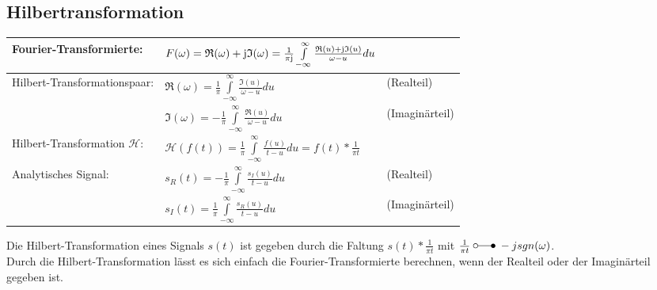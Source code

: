 \subsection{Hilbertransformation}
	\begin{tabular}{| l | l l |}
		\hline
			Fourier-Transformierte: & $F(\omega) = \mathfrak{R}(\omega) + \im \mathfrak{I}(\omega)
			= \frac{1}{\pi \im} \int\limits_{-\infty}^{\infty}\frac{\mathfrak{R}(u) + \im \mathfrak{I}(u)}{\omega - u} du$ & \\
		\hline
			Hilbert-Transformationspaar: & $\mathfrak{R}(\omega) = \frac{1}{\pi} \int\limits_{-\infty}^{\infty} \frac{\mathfrak{I}(u)}{\omega - u} du$ & (Realteil)\\
			& $\mathfrak{I}(\omega) = -\frac{1}{\pi} \int\limits_{-\infty}^{\infty} \frac{\mathfrak{R}(u)}{\omega - u} du$ & (Imaginärteil)\\
		\hline
			Hilbert-Transformation $\mathcal{H}$: & $\mathcal{H}(f(t)) = \frac{1}{\pi} \int\limits_{-\infty}^{\infty} \frac{f(u)}{t-u} du
			= f(t) * \frac{1}{\pi t}$ & \\
		\hline
			Analytisches Signal: & $s_R(t) = - \frac{1}{\pi} \int\limits_{-\infty}^{\infty} \frac{s_I(u)}{t-u} du$ & (Realteil)\\
			& $s_I(t) = \frac{1}{\pi} \int\limits_{-\infty}^{\infty} \frac{s_R(u)}{t-u} du$ & (Imaginärteil)\\
		\hline
	\end{tabular}

	Die Hilbert-Transformation eines Signals $s(t)$ ist gegeben durch die Faltung $s(t) * \frac{1}{\pi t}$ mit $\frac{1}{\pi t} \; \laplace \; -j sgn(\omega)$.\\
	Durch die Hilbert-Transformation lässt es sich einfach die Fourier-Transformierte berechnen, wenn der Realteil oder der Imaginärteil gegeben
	ist.
	